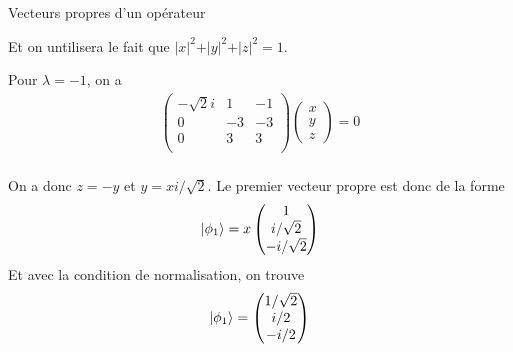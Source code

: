 \documentclass[12pt,solution=false]{uqtrassignment}
\begin{document}
\begin{problem}{Vecteurs propres d'un opérateur}
\begin{solution}
Et on untilisera le fait que
  $\vert x \vert^2 + \vert y \vert^2 +\vert z \vert^2=1$.



Pour $\lambda = -1$, on a
\begin{align}
  \begin{pmatrix}
     - \sqrt{2} i   &  1 & - 1\\
     0            &  -3          &-3\\
     0            &   3          & 3\\
  \end{pmatrix}
  \begin{pmatrix}
    x\\
    y\\
    z
  \end{pmatrix}
  = 0\\[3mm]
\end{align}

On a donc $z=-y$ et $y=x i/\sqrt{2}$.
Le premier vecteur propre est donc de la forme
\begin{align}
  \ket{\phi_1} = 
  x
  \begin{pmatrix}
    1\\
    i/\sqrt{2}\\
    -i/\sqrt{2}
  \end{pmatrix}
\end{align}
Et avec la condition de normalisation, on trouve
\begin{align}
  \ket{\phi_1} = 
  \begin{pmatrix}
    1/\sqrt{2}\\
    i/2\\
    -i/2
  \end{pmatrix}
\end{align}




\end{solution}
\end{problem}
\end{document}
